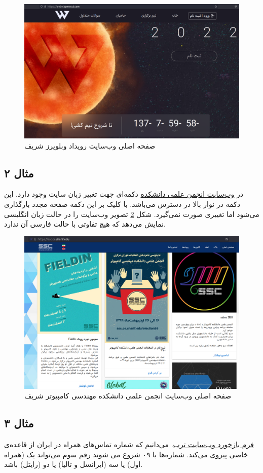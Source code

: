 {\begin{figure}[H]
	\centering
	\includegraphics[width=0.5\linewidth]{figs/bug1}
	\caption[صفحه اصلی وب‌سایت رویداد وبلوپرز شریف]{صفحه اصلی وب‌سایت رویداد وبلوپرز شریف}
	\label{fig:bug1}
\end{figure}


\subsection*{مثال ۲}


در \href{ssc.ce.sharif.edu}{وب‌سایت انجمن علمی دانشکده} دکمه‌ای جهت تغییر زبان سایت وجود دارد. این دکمه در نوار بالا در دسترس می‌باشد. با کلیک بر این دکمه صفحه مجدد بارگذاری می‌شود اما تغییری صورت نمی‌گیرد.
شکل \ref{fig:bug2} تصویر وب‌سایت را در حالت زبان انگلیسی نمایش می‌دهد که هیچ تفاوتی با حالت فارسی ‌آن ندارد.
\begin{figure}[H]
	\centering
	\includegraphics[width=0.5\linewidth]{figs/bug2}
	\caption[صفحه اصلی وب‌سایت انجمن علمی دانشکده مهندسی کامپیوتر شریف]{صفحه اصلی وب‌سایت انجمن علمی دانشکده مهندسی کامپیوتر شریف}
	\label{fig:bug2}
\end{figure}


\subsection*{مثال ۳}
\href{https://torob.com/feedback/}{فرم بازخورد وب‌سایت ترب}.
می‌دانیم که شماره تماس‌های همراه در ایران از قاعده‌ی خاصی پیروی می‌کند. شماره‌ها با ۰۹ شروع می شوند رقم سوم  می‌تواند یک (همراه اول) یا سه (ایرانسل و تالیا) یا دو (رایتل) باشد. \cite{phoneregex}

}
